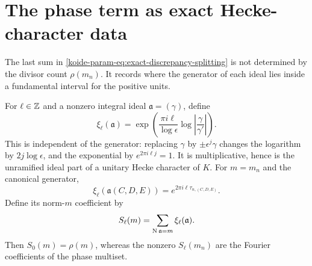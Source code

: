 \section{The phase term as exact Hecke-character data}

The last sum in \eqref{koide-param-eq:exact-discrepancy-splitting} is not determined
by the divisor count $\rho(m_n)$.  It records where the generator of each
ideal lies inside a fundamental interval for the positive units.

For $\ell\in\mathbb Z$ and a nonzero integral ideal $\mathfrak a=(\gamma)$,
define
\begin{equation}
 \xi_\ell(\mathfrak a)=
 \exp\!\left(
  \frac{\pi i\ell}{\log\epsilon}
  \log\left|\frac{\gamma}{\gamma'}\right|
 \right).
 \label{koide-param-eq:Hecke-character}
\end{equation}
This is independent of the generator: replacing $\gamma$ by
$\pm\epsilon^j\gamma$ changes the logarithm by $2j\log\epsilon$, and
the exponential by $e^{2\pi i\ell j}=1$.  It is multiplicative, hence is
the unramified ideal part of a unitary Hecke character of $K$.  For
$m=m_n$ and the canonical generator,
\begin{equation}
 \xi_\ell(\mathfrak a(C,D,E))
 =e^{2\pi i\ell\tau_{n,(C,D,E)}}.
 \label{koide-param-eq:character-phase}
\end{equation}
Define its norm-$m$ coefficient by
\begin{equation}
 S_\ell(m)=\sum_{\operatorname N\mathfrak a=m}\xi_\ell(\mathfrak a).
 \label{koide-param-eq:S-ell}
\end{equation}
Then $S_0(m)=\rho(m)$, whereas the nonzero $S_\ell(m_n)$ are the Fourier
coefficients of the phase multiset.

